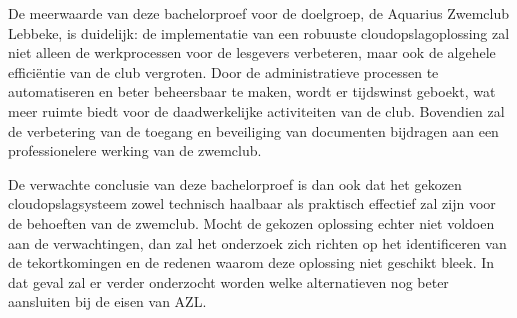 De meerwaarde van deze bachelorproef voor de doelgroep, de Aquarius Zwemclub Lebbeke, is duidelijk: de implementatie van een robuuste cloudopslagoplossing zal niet alleen de werkprocessen voor de lesgevers verbeteren, maar ook de algehele efficiëntie van de club vergroten. Door de administratieve processen te automatiseren en beter beheersbaar te maken, wordt er tijdswinst geboekt, wat meer ruimte biedt voor de daadwerkelijke activiteiten van de club. Bovendien zal de verbetering van de toegang en beveiliging van documenten bijdragen aan een professionelere werking van de zwemclub.

De verwachte conclusie van deze bachelorproef is dan ook dat het gekozen cloudopslagsysteem zowel technisch haalbaar als praktisch effectief zal zijn voor de behoeften van de zwemclub. Mocht de gekozen oplossing echter niet voldoen aan de verwachtingen, dan zal het onderzoek zich richten op het identificeren van de tekortkomingen en de redenen waarom deze oplossing niet geschikt bleek. In dat geval zal er verder onderzocht worden welke alternatieven nog beter aansluiten bij de eisen van AZL.